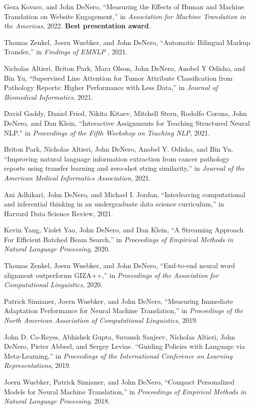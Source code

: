 \documentclass[margin,line]{res}
\begin{document}
\begin{resume}
Geza Kovacs, and John DeNero, ``Measuring the Effects of Human and Machine Translation on Website Engagement,'' in {\it Association for Machine Translation in the Americas}, 2022. \textbf{Best presentation award}.

Thomas Zenkel, Joern Wuebker, and John DeNero, ``Automatic Bilingual Markup Transfer,'' in {\it Findings of EMNLP }, 2021.

Nicholas Altieri, Briton Park, Mara Olson, John DeNero, Anobel Y Odisho, and Bin Yu, ``Supervised Line Attention for Tumor Attribute Classification from Pathology Reports: Higher Performance with Less Data,'' in {\it Journal of Biomedical Informatics}, 2021.

David Gaddy, Daniel Fried, Nikita Kitaev, Mitchell Stern, Rodolfo Corona, John DeNero, and Dan Klein, ``Interactive Assignments for Teaching Structured Neural NLP,'' in {\it Proceedings of the Fifth Workshop on Teaching NLP}, 2021.

Briton Park, Nicholas Altieri, John DeNero, Anobel Y. Odisho, and Bin Yu, ``Improving natural language information extraction from cancer pathology reports using transfer learning and zero-shot string similarity,'' in {\it Journal of the American Medical Informatics Association}, 2021.

Ani Adhikari, John DeNero, and Michael I. Jordan, ``Interleaving computational and inferential thinking in an undergraduate data science curriculum,'' in Harvard Data Science Review, 2021.

Kevin Yang, Violet Yao, John DeNero, and Dan Klein, ``A Streaming Approach For Efficient Batched Beam Search,'' in {\it Proceedings of Empirical Methods in Natural Language Processing}, 2020.

Thomas Zenkel, Joern Wuebker, and John DeNero, ``End-to-end neural word alignment outperforms GIZA++,'' in {\it Proceedings of the Association for Computational Linguistics}, 2020.

Patrick Simianer, Joern Wuebker, and John DeNero, ``Measuring Immediate Adaptation Performance for Neural Machine Translation,'' in {\it Proceedings of the North American Association of Computational Linguistics}, 2019.

John D. Co-Reyes, Abhishek Gupta, Suvansh Sanjeev, Nicholas Altieri, John DeNero, Pieter Abbeel, and Sergey Levine. ``Guiding Policies with Language via Meta-Learning,'' in {\it Proceedings of the International Conference on Learning Representations}, 2019.

Joern Wuebker, Patrick Simianer, and John DeNero, ``Compact Personalized Models for Neural Machine Translation,'' in {\it Proceedings of Empirical Methods in Natural Language Processing}, 2018.


\end{resume}
\end{document}
